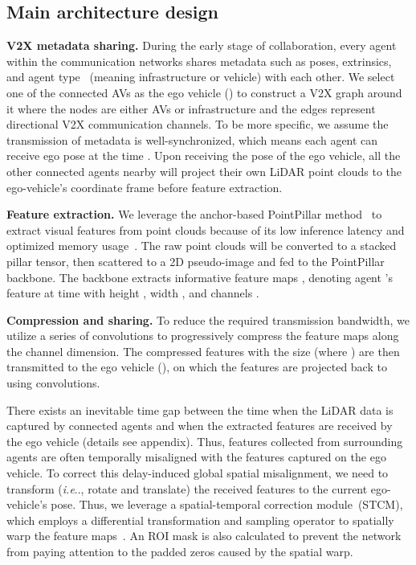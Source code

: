\documentclass[runningheads]{llncs}
\makeatletter
\DeclareRobustCommand\onedot{\futurelet\@let@token\@onedot}
\def\@onedot{\ifx\@let@token.\else.\null\fi\xspace}
\def\ie{\emph{i.e}\onedot} \def\Ie{\emph{I.e}\onedot}
\makeatother
\begin{document}
\subsection{Main architecture design}
\label{ssec:overall}

\noindent\textbf{V2X metadata sharing.}
During the early stage of collaboration, every agent  within the communication networks shares metadata such as poses, extrinsics, and agent type ~(meaning infrastructure or vehicle) with each other. We select one of the connected AVs as the ego vehicle () to construct a V2X graph around it where the nodes are either AVs or infrastructure and the edges represent directional V2X communication channels.  
To be more specific, we assume the transmission of metadata is well-synchronized, which means each agent  can receive ego pose  at the time . Upon receiving the pose of the ego vehicle, all the other connected agents nearby will project their own LiDAR point clouds to the ego-vehicle's coordinate frame before feature extraction. 

\noindent\textbf{Feature extraction.} We leverage the anchor-based PointPillar method~\cite{lang2019pointpillars} to extract visual features from point clouds because of its low inference latency and optimized memory usage~\cite{xu2021opv2v}. The raw point clouds will be converted to a stacked pillar tensor, then scattered to a 2D pseudo-image and fed to the PointPillar backbone. The backbone extracts informative feature maps , denoting agent 's feature at time  with  height , width , and channels .

\noindent\textbf{Compression and sharing.} 
To reduce the required transmission bandwidth, we utilize a series of  convolutions to progressively compress the feature maps along the channel dimension. The compressed features with the size  (where ) are then transmitted to the ego vehicle (), on which the features are projected back to  using  convolutions.

There exists an inevitable time gap between the time when the LiDAR data is captured by connected agents and when the extracted features are received by the ego vehicle (details see appendix). Thus, features collected from surrounding agents are often temporally misaligned with the features captured on the ego vehicle.
To correct this delay-induced global spatial misalignment, we need to transform (\ie, rotate and translate) the received features to the current ego-vehicle's pose. Thus, we leverage a spatial-temporal correction module~(STCM), which employs a differential transformation and sampling operator  to spatially warp the feature maps~\cite{jaderberg2015spatial}. An ROI mask is also calculated to prevent the network from paying attention to the padded zeros caused by the spatial warp.
\end{document}
